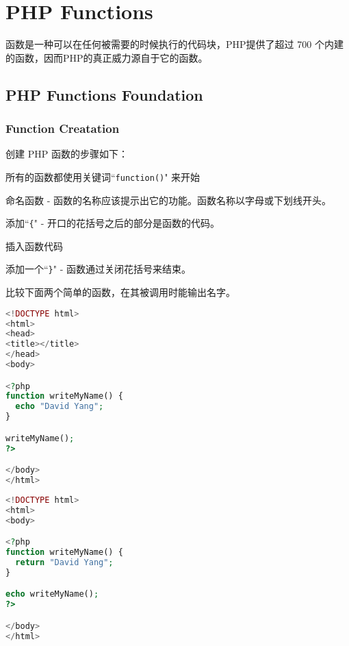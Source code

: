 \part{PHP Functions}


函数是一种可以在任何被需要的时候执行的代码块，PHP提供了超过 700 个内建的函数，因而PHP的真正威力源自于它的函数。



\chapter{PHP Functions Foundation}



\section{Function Creatation}

创建 PHP 函数的步骤如下：

\begin{compactitem}
\item 所有的函数都使用关键词``\texttt{function()}" 来开始
\item 命名函数 - 函数的名称应该提示出它的功能。函数名称以字母或下划线开头。
\item 添加``\texttt{\{}" - 开口的花括号之后的部分是函数的代码。
\item 插入函数代码
\item 添加一个``\texttt{\}}" - 函数通过关闭花括号来结束。
\end{compactitem}

比较下面两个简单的函数，在其被调用时能输出名字。

\begin{lstlisting}[language=PHP]
<!DOCTYPE html>
<html>
<head>
<title></title>
</head>
<body>

<?php
function writeMyName() {
  echo "David Yang";
}

writeMyName();
?>

</body>
</html>
\end{lstlisting}

\begin{lstlisting}[language=PHP]
<!DOCTYPE html>
<html>
<body>

<?php
function writeMyName() {
  return "David Yang";
}

echo writeMyName();
?>

</body>
</html>
\end{lstlisting}





